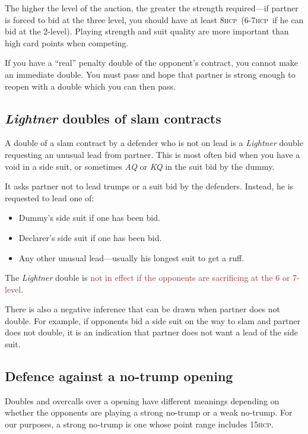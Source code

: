 \documentclass[a4paper,article,oneside]{memoir}
\newcommand{\hcp}{\textsc{hcp}}
\newcommand{\excp}[1]{\textcolor{Brown}{#1}} %
\begin{document}
The higher the level of the auction, the greater the strength
required---if partner is forced to bid at the three level, you should
have at least 8\hcp\ (6-7\hcp\ if he can bid at the 2-level).  Playing
strength and suit quality are more important than high card points
when competing.

If you have a ``real'' penalty double of the opponent's contract, you
cannot make an immediate double. You must pass and hope that partner
is strong enough to reopen with a double which you can then pass.

\subsection{\emph{Lightner} doubles of slam contracts}

A double of a slam contract by a defender who is not on lead is a
\emph{Lightner} double requesting an unusual lead from partner. This
is most often bid when you have a void in a side suit, or sometimes
\emph{AQ} or \emph{KQ} in the suit bid by the dummy.

It asks partner not to lead trumps or a suit bid by the
defenders. Instead, he is requested to lead one of:
\begin{itemize}
\item Dummy's side suit if one has been bid.
\item Declarer's side suit if one has been bid.
\item Any other unusual lead---usually his longest suit to get a
  ruff.
\end{itemize}

The \emph{Lightner} double is \excp{not in effect if the opponents are
  sacrificing at the 6 or 7-level}.

There is also a negative inference that can be drawn when partner does
not double. For example, if opponents bid a side suit on the way to
slam and partner does not double, it is an indication that partner
does not want a lead of the side suit.

\subsection{Defence against a no-trump opening}

Doubles and overcalls over a  opening have different meanings
depending on whether the opponents are playing a strong no-trump or a
weak no-trump. For our purposes, a strong no-trump is one whose point
range includes 15\hcp.
\end{document}
